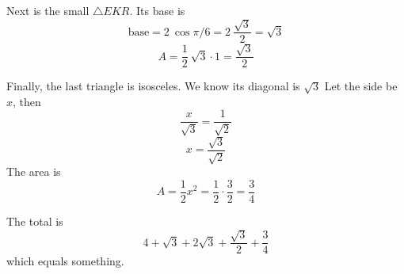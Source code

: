 \documentclass[11pt, oneside]{article}
\begin{document}
Next is the small $\triangle EKR$.  Its base is 
\[ \text{base} = 2 \ \cos \pi/6 = 2 \ \frac{\sqrt{3}}{2} = \sqrt{3} \]
\[ A = \frac{1}{2} \ \sqrt{3} \cdot 1 = \frac{\sqrt{3}}{2} \]

Finally, the last triangle is isosceles.  We know its diagonal is $\sqrt{3}$
Let the side be $x$, then
\[ \frac{x}{\sqrt{3}} = \frac{1}{\sqrt{2}} \]
\[ x = \frac{\sqrt{3}}{\sqrt{2}} \]
The area is
\[ A = \frac{1}{2} x^2 = \frac{1}{2} \cdot \frac{3}{2} = \frac{3}{4} \]

The total is
\[ 4 + \sqrt{3} + 2 \sqrt{3} + \frac{\sqrt{3}}{2} + \frac{3}{4} \]
which equals something.
\end{document}
